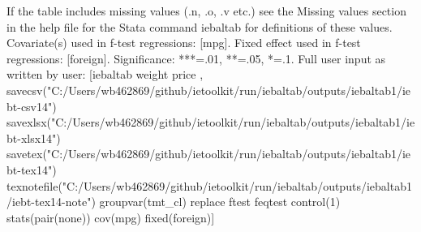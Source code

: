 If the table includes missing values (.n, .o, .v etc.) see the Missing values section in the help file for the Stata command iebaltab for definitions of these values. Covariate(s) used in f-test regressions: [mpg]. Fixed effect used in f-test regressions: [foreign]. Significance: ***=.01, **=.05, *=.1. Full user input as written by user: [iebaltab weight price , savecsv("C:/Users/wb462869/github/ietoolkit/run/iebaltab/outputs/iebaltab1/iebt-csv14") savexlsx("C:/Users/wb462869/github/ietoolkit/run/iebaltab/outputs/iebaltab1/iebt-xlsx14") savetex("C:/Users/wb462869/github/ietoolkit/run/iebaltab/outputs/iebaltab1/iebt-tex14") texnotefile("C:/Users/wb462869/github/ietoolkit/run/iebaltab/outputs/iebaltab1/iebt-tex14-note") groupvar(tmt\_cl) replace ftest feqtest control(1) stats(pair(none)) cov(mpg) fixed(foreign)] 
